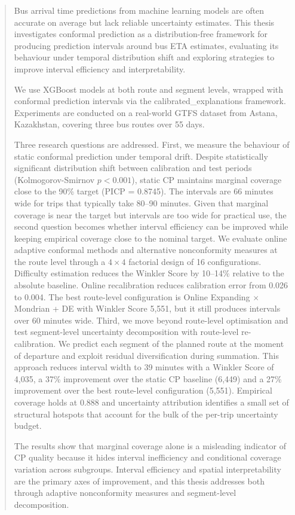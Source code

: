 \documentclass[12pt, a4paper, oneside]{report}
\begin{document}
\begin{abstract}

Bus arrival time predictions from machine learning models are often accurate on average but lack reliable uncertainty estimates. This thesis investigates conformal prediction as a distribution-free framework for producing prediction intervals around bus ETA estimates, evaluating its behaviour under temporal distribution shift and exploring strategies to improve interval efficiency and interpretability.

We use XGBoost models at both route and segment levels, wrapped with conformal prediction intervals via the calibrated\_explanations framework. Experiments are conducted on a real-world GTFS dataset from Astana, Kazakhstan, covering three bus routes over 55 days.

Three research questions are addressed. First, we measure the behaviour of static conformal prediction under temporal drift. Despite statistically significant distribution shift between calibration and test periods (Kolmogorov-Smirnov $p < 0.001$), static CP maintains marginal coverage close to the 90\% target (PICP = 0.8745). The intervals are 66 minutes wide for trips that typically take 80--90 minutes. Given that marginal coverage is near the target but intervals are too wide for practical use, the second question becomes whether interval efficiency can be improved while keeping empirical coverage close to the nominal target. We evaluate online adaptive conformal methods and alternative nonconformity measures at the route level through a $4 \times 4$ factorial design of 16 configurations. Difficulty estimation reduces the Winkler Score by 10--14\% relative to the absolute baseline. Online recalibration reduces calibration error from 0.026 to 0.004. The best route-level configuration is Online Expanding $\times$ Mondrian + DE with Winkler Score 5,551, but it still produces intervals over 60 minutes wide. Third, we move beyond route-level optimisation and test segment-level uncertainty decomposition with route-level re-calibration. We predict each segment of the planned route at the moment of departure and exploit residual diversification during summation. This approach reduces interval width to 39 minutes with a Winkler Score of 4,035, a 37\% improvement over the static CP baseline (6,449) and a 27\% improvement over the best route-level configuration (5,551). Empirical coverage holds at 0.888 and uncertainty attribution identifies a small set of structural hotspots that account for the bulk of the per-trip uncertainty budget.

The results show that marginal coverage alone is a misleading indicator of CP quality because it hides interval inefficiency and conditional coverage variation across subgroups. Interval efficiency and spatial interpretability are the primary axes of improvement, and this thesis addresses both through adaptive nonconformity measures and segment-level decomposition.

\end{abstract}
\end{document}
